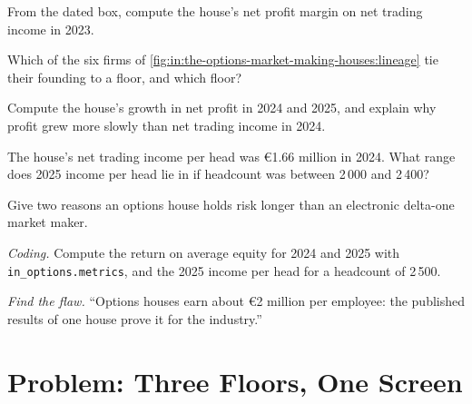 \begin{exercise}[$\star$]\label{exo:in:the-options-market-making-houses:2}
From the dated box, compute the house's net profit margin on net trading income in 2023.
\end{exercise}

\begin{exercise}[$\star$]\label{exo:in:the-options-market-making-houses:3}
Which of the six firms of \cref{fig:in:the-options-market-making-houses:lineage} tie their founding to a floor, and
which floor?
\end{exercise}

\begin{exercise}[$\star\star$]\label{exo:in:the-options-market-making-houses:4}
Compute the house's growth in net profit in 2024 and 2025, and explain why profit grew more slowly than net trading
income in 2024.
\end{exercise}

\begin{exercise}[$\star\star$]\label{exo:in:the-options-market-making-houses:5}
The house's net trading income per head was \euro1.66 million in 2024. What range does 2025 income per head lie in if
headcount was between 2\,000 and 2\,400?
\end{exercise}

\begin{exercise}[$\star\star$]\label{exo:in:the-options-market-making-houses:6}
Give two reasons an options house holds risk longer than an electronic delta-one market maker.
\end{exercise}

\begin{exercise}[$\star\star\star$]\label{exo:in:the-options-market-making-houses:7}
\emph{Coding.} Compute the return on average equity for 2024 and 2025 with \texttt{in\_options.metrics}, and the 2025
income per head for a headcount of 2\,500.
\end{exercise}

\begin{exercise}[$\star\star\star$]\label{exo:in:the-options-market-making-houses:8}
\emph{Find the flaw.} ``Options houses earn about \euro2 million per employee: the published results of one house prove
it for the industry.''
\end{exercise}

\section{Problem: Three Floors, One Screen}

